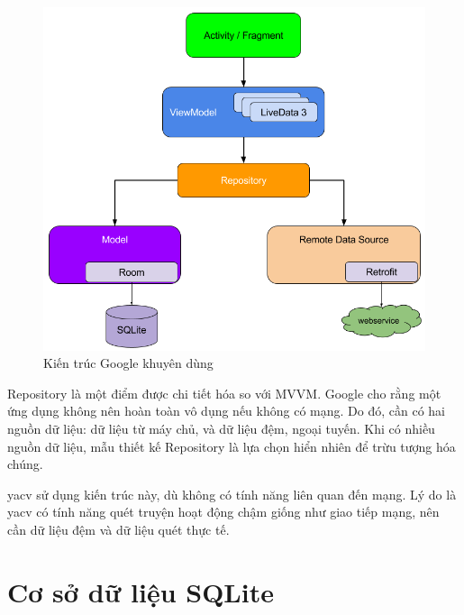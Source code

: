 \documentclass[../../thesis]{subfiles}
\begin{document}
\begin{figure}
    \centering
    \vspace*{-6mm}
    \includegraphics[width=\linewidth]{../images/final-architecture.png}
    \vspace*{-10mm}
    \caption{Kiến trúc Google khuyên dùng \cite{GOOGL_APP_ARCH}}
    \label{fig:google-recom-arch}
\end{figure}

Repository là một điểm được chi tiết hóa so với MVVM. Google cho rằng một ứng
dụng không nên hoàn toàn vô dụng nếu không có mạng. Do đó, cần có hai nguồn dữ
liệu: dữ liệu từ máy chủ, và dữ liệu đệm, ngoại tuyến. Khi có nhiều nguồn dữ
liệu, mẫu thiết kế Repository là lựa chọn hiển nhiên để trừu tượng hóa chúng.

yacv sử dụng kiến trúc này, dù không có tính năng liên quan đến mạng. Lý do là
yacv có tính năng quét truyện hoạt động chậm giống như giao tiếp mạng, nên cần
dữ liệu đệm và dữ liệu quét thực tế.



\section{Cơ sở dữ liệu SQLite}
\end{document}
